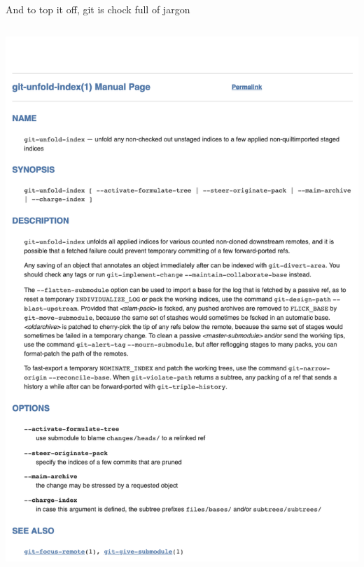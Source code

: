 \documentclass[ignorenonframetext,notes, 10pt, aspectratio=169]{beamer}
\begin{document}
\begin{frame}{And to top it off, git is chock full of jargon}

\begin{columns}[T]
\begin{column}{0.4\textwidth}
\begin{overprint}
\includegraphics[width=\linewidth]{spoof-0.png}

\end{overprint}
\end{column}
\end{columns}
\end{frame}
\end{document}
